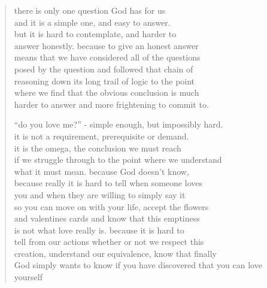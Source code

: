 \begin{verse}
there is only one question God has for us \\
and it is a simple one, and easy to answer. \\
but it is hard to contemplate, and harder to  \\
answer honestly. because to give an honest answer \\
means that we have considered all of the questions \\
posed by the question and followed that chain of \\
reasoning down its long trail of logic to the point \\
where we find that the obvious conclusion is much \\
harder to answer and more frightening to commit to. 

``do you love me?'' - simple enough, but impossibly hard. \\
it is not a requirement, prerequisite or demand. \\
it is the omega, the conclusion we must reach \\
if we struggle through to the point where we understand \\
what it must mean. because God doesn't know, \\
because really it is hard to tell when someone loves \\
you and when they are willing to simply say it \\
so you can move on with your life, accept the flowers \\
and valentines cards and know that this emptiness  \\
is not what love really is. because it is hard to  \\
tell from our actions whether or not we respect this  \\
creation, understand our equivalence, know that finally \\
God simply wants to know if you have discovered that you can love yourself
\end{verse}
